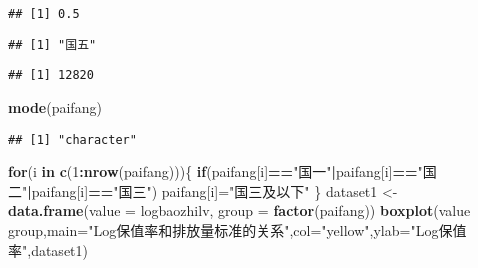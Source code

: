 \documentclass[]{article}
\newenvironment{Shaded}{\begin{snugshade}}{\end{snugshade}}
\newcommand{\KeywordTok}[1]{\textcolor[rgb]{0.13,0.29,0.53}{\textbf{#1}}}
\newcommand{\DataTypeTok}[1]{\textcolor[rgb]{0.13,0.29,0.53}{#1}}
\newcommand{\DecValTok}[1]{\textcolor[rgb]{0.00,0.00,0.81}{#1}}
\newcommand{\StringTok}[1]{\textcolor[rgb]{0.31,0.60,0.02}{#1}}
\newcommand{\ControlFlowTok}[1]{\textcolor[rgb]{0.13,0.29,0.53}{\textbf{#1}}}
\newcommand{\OperatorTok}[1]{\textcolor[rgb]{0.81,0.36,0.00}{\textbf{#1}}}
\newcommand{\NormalTok}[1]{#1}
\begin{document}
\begin{verbatim}
## [1] 0.5
\end{verbatim}

\begin{Shaded}
\end{Shaded}

\begin{verbatim}
## [1] "国五"
\end{verbatim}

\begin{Shaded}
\end{Shaded}

\begin{verbatim}
## [1] 12820
\end{verbatim}

\begin{Shaded}
\begin{Highlighting}[]
\KeywordTok{mode}\NormalTok{(paifang)}
\end{Highlighting}
\end{Shaded}

\begin{verbatim}
## [1] "character"
\end{verbatim}

\begin{Shaded}
\begin{Highlighting}[]
\ControlFlowTok{for}\NormalTok{(i }\ControlFlowTok{in} \KeywordTok{c}\NormalTok{(}\DecValTok{1}\OperatorTok{:}\KeywordTok{nrow}\NormalTok{(paifang)))\{}
  \ControlFlowTok{if}\NormalTok{(paifang[i]}\OperatorTok{==}\StringTok{"国一"}\OperatorTok{|}\NormalTok{paifang[i]}\OperatorTok{==}\StringTok{"国二"}\OperatorTok{|}\NormalTok{paifang[i]}\OperatorTok{==}\StringTok{"国三"}\NormalTok{) paifang[i]=}\StringTok{"国三及以下"}
\NormalTok{\}}
\NormalTok{dataset1 <-}\StringTok{ }\KeywordTok{data.frame}\NormalTok{(}\DataTypeTok{value =}\NormalTok{ logbaozhilv, }\DataTypeTok{group =} \KeywordTok{factor}\NormalTok{(paifang))}
\KeywordTok{boxplot}\NormalTok{(value }\OperatorTok{~}\StringTok{ }\NormalTok{group,}\DataTypeTok{main=}\StringTok{"Log保值率和排放量标准的关系"}\NormalTok{,}\DataTypeTok{col=}\StringTok{"yellow"}\NormalTok{,}\DataTypeTok{ylab=}\StringTok{"Log保值率"}\NormalTok{,dataset1)}
\end{Highlighting}
\end{Shaded}
\end{document}
